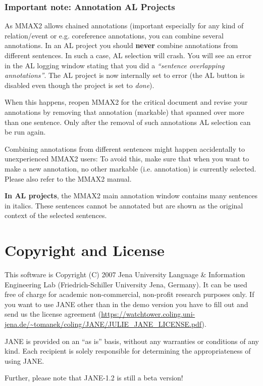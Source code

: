 \documentclass[DIV12,english,11pt,halfparskip]{scrartcl}
\begin{document}
\subsubsection{Important note: Annotation AL Projects} 

As MMAX2 allows chained annotations (important especially for any kind
of relation/event or e.g. coreference annotations, you can combine
several annotations. In an AL project you should \textbf{never}
combine annotations from different sentences. In such a case, AL
selection will crash. You will see an error in the AL logging window
stating that you did a \emph{``sentence overlapping
  annotations''}. The AL project is now internally set to error (the
AL button is disabled even though the project is set to \emph{done}).

When this happens, reopen MMAX2 for the critical document and revise
your annotations by removing that annotation (markable) that spanned
over more than one sentence.  Only after the removal of such
annotations AL selection can be run again.

Combining annotations from different sentences might happen
accidentally to unexperienced MMAX2 users: To avoid this, make sure
that when you want to make a new annotation, no other markable (i.e.
annotation) is currently selected. Please also refer to the MMAX2
manual.



\textbf{In AL projects}, the MMAX2 main annotation window contains many
sentences in italics. These sentences cannot be annotated but are
shown as the original context of the selected sentences.


\section{Copyright and License}

This software is Copyright (C) 2007 Jena University Language \&
Information Engineering Lab (Friedrich-Schiller University Jena,
Germany). It can be used free of charge for academic non-commercial,
non-profit research purposes only. If you want to use JANE other than
in the demo version you have to fill out and send us the license
agreement
(\url{https://watchtower.coling.uni-jena.de/~tomanek/coling/JANE/JULIE_JANE_LICENSE.pdf}).

JANE is provided on an ``as is'' basis, without any warranties or
conditions of any kind. Each recipient is solely responsible for
determining the appropriateness of using JANE.

Further, please note that JANE-1.2 is still a beta version!





\end{document}
